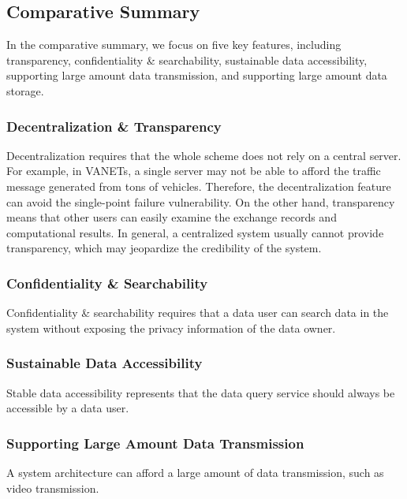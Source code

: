 \documentclass[journal]{IEEEtran}
\begin{document}
    \subsection{Comparative Summary}
    
    In the comparative summary, we focus on five key features, including transparency, confidentiality \& searchability, sustainable data accessibility, supporting large amount data transmission, and supporting large amount data storage.
 
    \subsubsection{Decentralization \& Transparency}
    
    Decentralization requires that the whole scheme does not rely on a central server. For example, in VANETs, a single server may not be able to afford the traffic message generated from tons of vehicles. Therefore, the decentralization feature can avoid the single-point failure vulnerability. On the other hand, transparency means that other users can easily examine the exchange records and computational results. In general, a centralized system usually cannot provide transparency, which may jeopardize the credibility of the system. 


    \subsubsection{Confidentiality \& Searchability}
    
    Confidentiality \& searchability requires that a data user can search data in the system without exposing the privacy information of the data owner.
  
    \subsubsection{Sustainable Data Accessibility}
    
    Stable data accessibility represents that the data query service should always be accessible by a data user.
  
    \subsubsection{Supporting Large Amount Data Transmission}
    
    A system architecture can afford a large amount of data transmission, such as video transmission.
  
\end{document}
